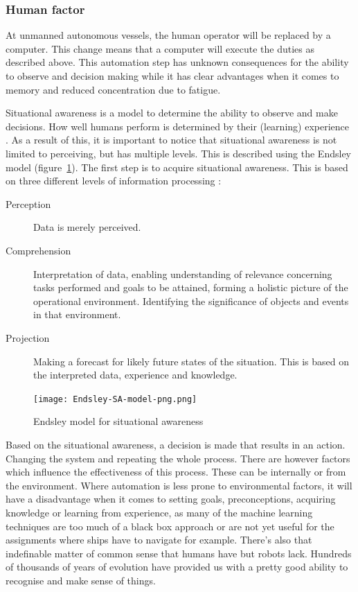 \subsubsection{Human factor}
At unmanned autonomous vessels, the human operator will be replaced by a computer. This change means that a computer will execute the duties as described above. This automation step has unknown consequences for the ability to observe and decision making while it has clear advantages when it comes to memory and reduced concentration due to fatigue.

Situational awareness is a model to determine the ability to observe and make decisions. How well humans perform is determined by their (learning) experience \cite{Underwood2013}. As a result of this, it is important to notice that situational awareness is not limited to perceiving, but has multiple levels. This is described using the Endsley model (figure~\ref{fig:Endsley-SA-model}).
The first step is to acquire situational awareness. This is based on three different levels of information processing \cite{Kalloniatis2017}: 

\begin{description}
	\item [Perception] Data is merely perceived.
	\item [Comprehension] Interpretation of data, enabling understanding of relevance concerning tasks performed and goals to be attained, forming a holistic picture of the operational environment. Identifying the significance of objects and events in that environment.
	\item [Projection] Making a forecast for likely future states of the situation. This is based on the interpreted data, experience and knowledge.
\end{description}

\begin{figure}[p]
	\centering
	\texttt{[image: Endsley-SA-model-png.png]}
	\caption{Endsley model for situational awareness}
	\label{fig:Endsley-SA-model}
\end{figure}

Based on the situational awareness, a decision is made that results in an action. Changing the system and repeating the whole process. There are however factors which influence the effectiveness of this process. These can be internally or from the environment. Where automation is less prone to environmental factors, it will have a disadvantage when it comes to setting goals, preconceptions, acquiring knowledge or learning from experience, as many of the machine learning techniques are too much of a black box approach or are not yet useful for the assignments where ships have to navigate for example. There’s also that indefinable matter of common sense that humans have but robots lack. Hundreds of thousands of years of evolution have provided us with a pretty good ability to recognise and make sense of things.

